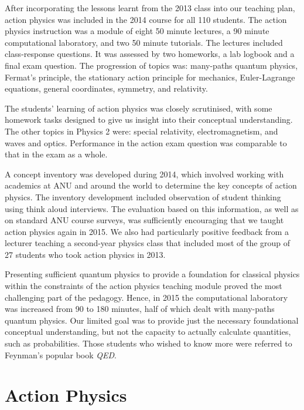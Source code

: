 \documentclass[prb,oncolumn,12pt]{revtex4-2}
\begin{document}
After incorporating the lessons learnt from the 2013 class into our teaching plan, action physics was included in the 2014 course for all 110 students. The action physics instruction was a module of eight 50 minute lectures, a 90 minute computational laboratory, and two 50 minute tutorials. The lectures included class-response questions.  It was assessed by two homeworks, a lab logbook and a final exam question. The progression of topics was: many-paths quantum physics, Fermat's principle, the stationary action principle for mechanics, Euler-Lagrange equations, general coordinates, symmetry, and relativity.

The students' learning of action physics was closely scrutinised, with some homework tasks designed to give us insight into their conceptual understanding.  The other topics in Physics 2 were: special relativity, electromagnetism, and waves and optics. Performance in the action exam question was comparable to that in the exam as a whole.

A concept inventory was developed during 2014, which involved working with academics at ANU and around the world to determine the key concepts of action physics. \cite{McGinness} The inventory development included observation of student thinking using think aloud interviews. \cite{Adams} The evaluation based on this information, as well as on standard ANU course surveys, was sufficiently encouraging that we taught action physics again in 2015. We also had  particularly positive feedback from a lecturer teaching a second-year physics class that included most of the group of 27 students who took action physics in 2013.

Presenting sufficient quantum physics to provide a foundation for classical physics within the constraints of the action physics teaching module proved the most challenging part of the pedagogy. Hence, in 2015 the computational laboratory was increased from 90 to 180 minutes, half of which dealt with many-paths quantum physics. Our limited goal was to provide just the necessary foundational conceptual understanding, but not the capacity to actually calculate quantities, such as probabilities. Those students who wished to know more were referred to Feynman's popular book \textit{QED}.  \cite{QED}


\section{Action Physics}
\label{Action Physics}
\end{document}
